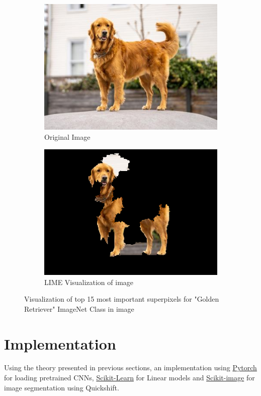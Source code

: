 \begin{figure}
    \captionsetup{justification=centering}

    \begin{subfigure}[t]{0.48\textwidth}
        \captionsetup{justification=centering}
        \centering
        \includegraphics[width=.7\linewidth]{figuras/lime/dog.jpg}
        \caption{Original Image}
    \end{subfigure}
    \hfill
    \begin{subfigure}[t]{0.48\textwidth}
        \captionsetup{justification=centering}
        \centering
        \includegraphics[width=0.5\linewidth]{figuras/lime/lime_dog_sp0.4_dk0.5_nc10.png}
        \caption{LIME Visualization of image}
    \end{subfigure}
    \caption{Visualization of top 15 most important superpixels for "Golden Retriever" ImageNet \citep{russakovsky2015imagenetlargescalevisual} Class in image}
    \label{fig:LIME_vis_image}
\end{figure}

\section{Implementation}

Using the theory presented in previous sections, an implementation using \href{https://pytorch.org/}{Pytorch} for loading pretrained CNNs, \href{https://scikit-learn.org/stable/}{Scikit-Learn} for Linear models and \href{https://scikit-image.org/}{Scikit-image} for image segmentation using Quickshift.

